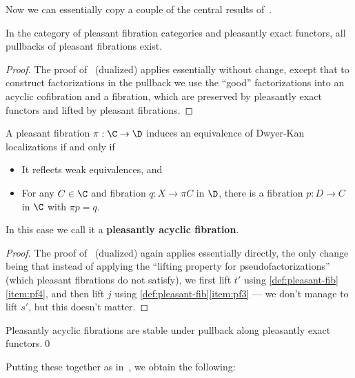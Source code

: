 \documentclass{amsart}
\begin{document}
Now we can essentially copy a couple of the central results of~\cite[\S1.2]{szumilo:cocompl-hoth}.

\begin{lem}\label{thm:pb-plfib}
  In the category of pleasant fibration categories and pleasantly exact functors, all pullbacks of pleasant fibrations exist.
\end{lem}
\begin{proof}
  The proof of~\cite[Proposition 1.10]{szumilo:cocompl-hoth} (dualized) applies essentially without change, except that to construct factorizations in the pullback we use the ``good'' factorizations into an acyclic cofibration and a fibration, which are preserved by pleasantly exact functors and lifted by pleasant fibrations.
\end{proof}

\begin{lem}
  A pleasant fibration $\pi:\C\to\D$ induces an equivalence of Dwyer-Kan localizations if and only if
  \begin{itemize}
  \item It reflects weak equivalences, and
  \item For any $C\in\C$ and fibration $q:X\to \pi C$ in $\D$, there is a fibration $p:D\to C$ in $\C$ with $\pi p = q$.
  \end{itemize}
  In this case we call it a \textbf{pleasantly acyclic fibration}.
\end{lem}
\begin{proof}
  The proof of~\cite[Proposition 1.10]{szumilo:cocompl-hoth} (dualized) again applies essentially directly, the only change being that instead of applying the ``lifting property for pseudofactorizations'' (which pleasant fibrations do not satisfy), we first lift $t'$ using \cref{def:pleasant-fib}\ref{item:pf4}, and then lift $j$ using \cref{def:pleasant-fib}\ref{item:pf3} --- we don't manage to lift $s'$, but this doesn't matter.
\end{proof}

\begin{cor}\label{thm:pb-plafib}
  Pleasantly acyclic fibrations are stable under pullback along pleasantly exact functors.\qed
\end{cor}

Putting these together as in~\cite[Theorem 1.14]{szumilo:cocompl-hoth}, we obtain the following:
\end{document}
